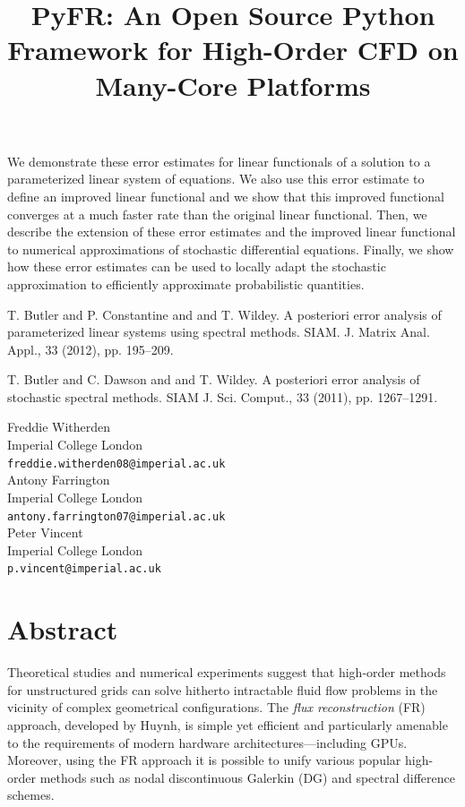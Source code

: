 \documentclass[article,A4,11pt]{llncs}%
\begin{document}
We demonstrate these error estimates for linear functionals of a solution to a parameterized linear system of equations.  We also use this error estimate to define an improved linear functional and we show that this improved functional converges at a much faster rate than the original linear functional.  Then, we describe the extension of these error estimates and the improved linear functional to numerical approximations of stochastic differential equations.  Finally, we show how these error estimates can be used to locally adapt the stochastic approximation to efficiently approximate probabilistic quantities.


\begin{thebibliography}{10}
{\sc T. Butler and P. Constantine and and T. Wildey}. {A posteriori error analysis of parameterized linear systems using spectral methods}.  SIAM. J. Matrix Anal. Appl., 33 (2012), pp. 195–209.

{\sc T. Butler and C. Dawson and and T. Wildey}. {A posteriori error analysis of stochastic spectral methods}.  SIAM J. Sci. Comput., 33 (2011), pp. 1267–1291.
\end{thebibliography}

\title{PyFR: An Open Source Python Framework for High-Order CFD on Many-Core Platforms}
 \author{} \institute{}
\maketitle
\begin{center}
{\large Freddie Witherden}\\
Imperial College London\\
{\tt freddie.witherden08@imperial.ac.uk}
\\ \vspace{4mm}
{\large Antony Farrington}\\
Imperial College London\\
{\tt antony.farrington07@imperial.ac.uk}
\\ \vspace{4mm}
{\large Peter Vincent}\\
Imperial College London\\
{\tt p.vincent@imperial.ac.uk}
\end{center}

\section*{Abstract}
Theoretical studies and numerical experiments suggest that high-order methods for unstructured grids can solve hitherto intractable fluid flow problems in the vicinity of complex geometrical configurations. The \emph{flux reconstruction} (FR) approach, developed by Huynh, is simple yet efficient and particularly amenable to the requirements of modern hardware architectures---including GPUs. Moreover, using the FR approach it is possible to unify various popular high-order methods such as nodal discontinuous Galerkin (DG) and spectral difference schemes.
\end{document}
